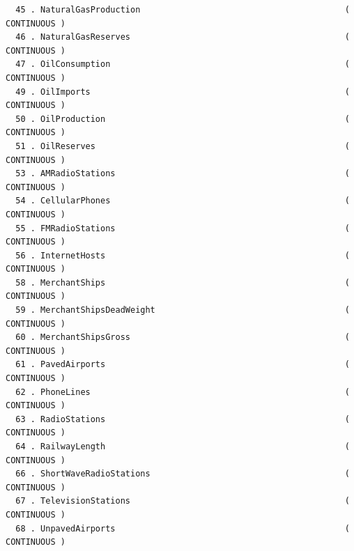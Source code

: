 \documentclass[a4paper,10pt,twocolumn]{article}
\begin{document}
\begin{landscape}
\begin{verbatim}
  45 . NaturalGasProduction                                         ( CONTINUOUS )
  46 . NaturalGasReserves                                           ( CONTINUOUS )
  47 . OilConsumption                                               ( CONTINUOUS )
  49 . OilImports                                                   ( CONTINUOUS )
  50 . OilProduction                                                ( CONTINUOUS )
  51 . OilReserves                                                  ( CONTINUOUS )
  53 . AMRadioStations                                              ( CONTINUOUS )
  54 . CellularPhones                                               ( CONTINUOUS )
  55 . FMRadioStations                                              ( CONTINUOUS )
  56 . InternetHosts                                                ( CONTINUOUS )
  58 . MerchantShips                                                ( CONTINUOUS )
  59 . MerchantShipsDeadWeight                                      ( CONTINUOUS )
  60 . MerchantShipsGross                                           ( CONTINUOUS )
  61 . PavedAirports                                                ( CONTINUOUS )
  62 . PhoneLines                                                   ( CONTINUOUS )
  63 . RadioStations                                                ( CONTINUOUS )
  64 . RailwayLength                                                ( CONTINUOUS )
  66 . ShortWaveRadioStations                                       ( CONTINUOUS )
  67 . TelevisionStations                                           ( CONTINUOUS )
  68 . UnpavedAirports                                              ( CONTINUOUS )


\end{verbatim}
\end{landscape}
\end{document}
